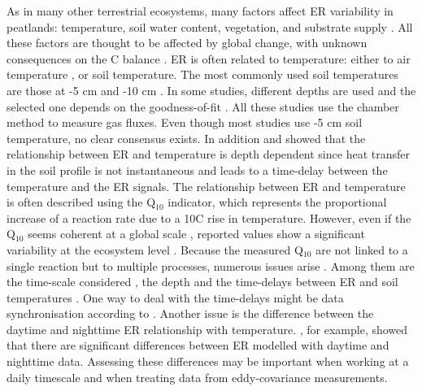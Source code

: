 As in many other terrestrial ecosystems, many factors affect ER variability in peatlands: temperature, soil water content, vegetation, and substrate supply \citep{luo2006}.
All these factors are thought to be affected by global change, with unknown consequences on the C balance \citep{limpens2008}.
ER is often related to temperature: either to air temperature \citep[e.g.,][]{bortoluzzi2006a}, or soil temperature.
The most commonly used soil temperatures are those at -5 cm \citep{ballantyne2014,gorres2014} and -10 cm \citep{kim1992,zhu2015}.
In some studies, different depths are used and the selected one depends on the goodness-of-fit \citep{gunther2014, zhu2015}.
All these studies use the chamber method to measure gas fluxes.
Even though most studies use -5 cm soil temperature, no clear consensus exists.
In addition \citet{pavelka2007} and \citet{graf2008} showed that the relationship between ER and temperature is depth dependent since heat transfer in the soil profile is not instantaneous and leads to a time-delay between the temperature and the ER signals.
The relationship between ER and temperature is often described using the Q$_{10}$ indicator, which represents the proportional increase of a reaction rate due to a 10\textdegree C rise in temperature.
However, even if the Q$_{10}$ seems coherent at a global scale \citep{mahecha2010}, reported values show a significant variability at the ecosystem level \citep{graf2008}.
Because the measured Q$_{10}$ are not linked to a single reaction but to multiple processes, numerous issues arise \citep{davidson2006}.
Among them are the time-scale considered \citep{curielyuste2004}, the depth \citep{graf2008} and the time-delays between ER and soil temperatures \citep{phillips2011}.
One way to deal with the time-delays might be data synchronisation according to \citet{pavelka2007}.
Another issue is the difference between the daytime and nighttime ER relationship with temperature. 
\citet{juszczak2012}, for example, showed that there are significant differences between ER modelled with daytime and nighttime data.
Assessing these differences may be important when working at a daily timescale and when treating data from eddy-covariance measurements.

